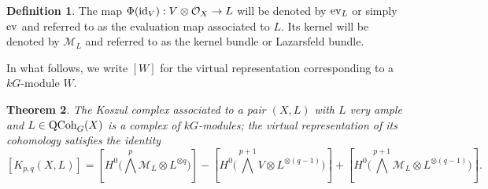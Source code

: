 \documentclass[10pt]{amsart}
\newtheorem{theorem}{Theorem}[subsection]
\theoremstyle{definition}
\newtheorem{definition}[theorem]{Definition}
\begin{document}
\begin{definition}
The map $\Phi({\rm id}_V):V\otimes\mathcal{O}_X\rightarrow L$ will be denoted by ${\rm ev}_L$ or simply ${\rm ev}$ and referred to as the evaluation map associated to $L$. Its kernel will be denoted by $\mathcal{M}_L$ and referred to as the kernel bundle or Lazarsfeld bundle.
\end{definition}
In what follows, we write $[W]$ for the virtual representation corresponding to a $kG$-module $W$.

\begin{theorem}\label{th:main}
The Koszul complex associated to a pair $(X,L)$ with $L$ very ample and $L\in{\rm QCoh}_G(X)$ is a complex of $kG$-modules; the virtual representation of its cohomology satisfies the identity
\[
[K_{p,q}(X,L)]
=[H^0\big(\bigwedge^p\mathcal{M}_L\otimes L^{\otimes q}\big)]
-[H^0\big(\bigwedge^{p+1}V\otimes  L^{\otimes (q-1)}\big)]
+[H^0\big( \bigwedge^{p+1}\mathcal{M}_L\otimes L^{\otimes (q-1)}\big)].
\]
\end{theorem}
\end{document}
